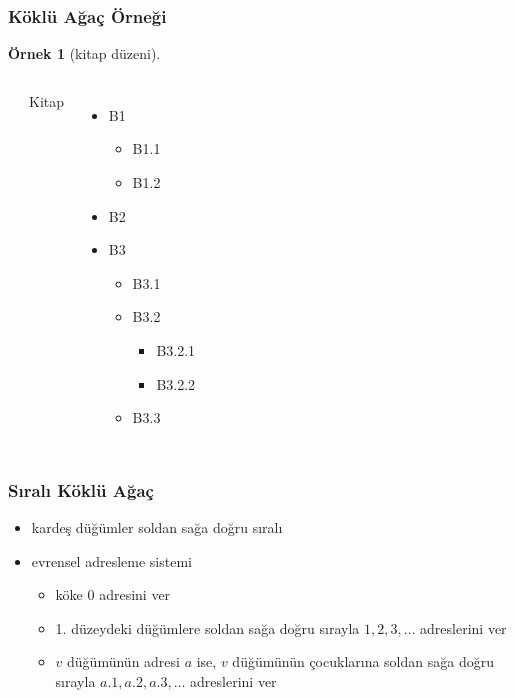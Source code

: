 \documentclass[dvipsnames]{beamer}
\theoremstyle{definition}
\theoremstyle{example}
\newtheorem{ornek}[theorem]{Örnek}
\theoremstyle{plain}
\begin{document}
\begin{frame}
  \frametitle{Köklü Ağaç Örneği}

  \begin{ornek}[kitap düzeni]
    \begin{columns}
      \begin{center}
      \end{center}

      \pause
      Kitap
      \begin{itemize}
        \item B1
        \begin{itemize}
          \item B1.1
          \item B1.2
        \end{itemize}
        \item B2
        \item B3
        \begin{itemize}
          \item B3.1
          \item B3.2
          \begin{itemize}
            \item B3.2.1
            \item B3.2.2
          \end{itemize}
          \item B3.3
        \end{itemize}
      \end{itemize}
    \end{columns}
  \end{ornek}
\end{frame}

\begin{frame}
  \frametitle{Sıralı Köklü Ağaç}

  \begin{itemize}
    \item kardeş düğümler soldan sağa doğru sıralı

    \pause
    \medskip
    \item \alert{evrensel adresleme sistemi}
    \begin{itemize}
      \item köke $0$ adresini ver
      \item 1. düzeydeki düğümlere soldan sağa doğru sırayla $1,2,3,\dots$
        adreslerini ver
      \item $v$ düğümünün adresi $a$ ise, $v$ düğümünün çocuklarına soldan sağa
        doğru sırayla $a.1,a.2,a.3,\dots$ adreslerini ver
    \end{itemize}
  \end{itemize}
\end{frame}
\end{document}
